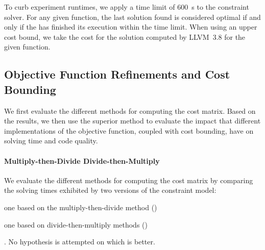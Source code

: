 To curb experiment runtimes, we apply a time limit of \SI{600}{\s} to the
\gls{constraint solver}.
%
For any given \gls{function}, the last \gls{solution} found is considered
optimal if and only if the  has finished its
execution within the time limit.
%
When using an upper cost bound, we take the cost for the \gls{solution} computed
by \mbox{\gls{LLVM} 3.8} for the given \gls{function}.


\subsection{Objective Function Refinements and Cost Bounding}

We first evaluate the different methods for computing the cost matrix.
%
Based on the results, we then use the superior method to evaluate the impact
that different implementations of the \gls{objective function}, coupled with
cost bounding, have on solving time and code quality.


\paragraph{Multiply-then-Divide \versus Divide-then-Multiply}

We evaluate the different methods for computing the cost matrix by
comparing the solving times exhibited by two versions of the \gls{constraint
  model}:
%
\begin{modelList}
  \item {}
    one based on the \gls{multiply-then-divide method}
    ()
  \item {}
    one based on \glspl{divide-then-multiply method}
    ()
\end{modelList}.
%
No hypothesis is attempted on which  is better.

